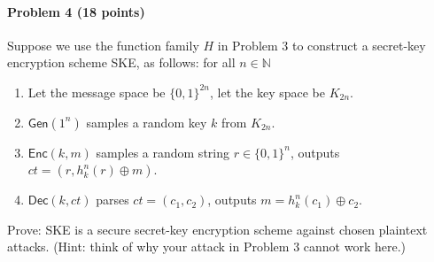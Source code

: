 \paragraph{Problem 4 (18 points)}
Suppose we use the function family $H$ in Problem 3 to construct a secret-key encryption scheme SKE, as follows: for all $n\in\mathbb{N}$
\begin{enumerate}[itemsep=0pt]
\item Let the message space be $\{0,1\}^{2n}$, let the key space be $K_{2n}$. 
\item $\mathsf{Gen}(1^n)$ samples a random key $k$ from $K_{2n}$. 
\item $\mathsf{Enc}(k, m)$ samples a random string $r\in\{0,1\}^{n}$, outputs $ct = (r, h^n_k(r)\oplus m)$.
\item $\mathsf{Dec}(k, ct)$ parses $ct = (c_1, c_2)$, outputs $m = h^n_k(c_1)\oplus c_2$.
\end{enumerate}

Prove: SKE is a secure secret-key encryption scheme against chosen plaintext attacks. (Hint: think of why your attack in Problem 3 cannot work here.)
